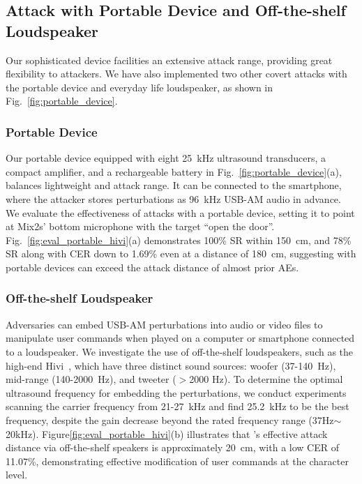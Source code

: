 \subsection{Attack with Portable Device and Off-the-shelf Loudspeaker}\label{sec:portable_attack}
Our sophisticated device facilities an extensive attack range, providing great flexibility to attackers. We have also implemented two other covert attacks with the portable device and everyday life loudspeaker, as shown in Fig.~\ref{fig:portable_device}.
\subsubsection{Portable Device}
Our portable device equipped with eight 25~kHz ultrasound transducers, a compact amplifier, and a rechargeable battery in Fig.~\ref{fig:portable_device}(a), balances lightweight and attack range. It can be connected to the smartphone, where the attacker stores perturbations as 96~kHz USB-AM audio in advance. We evaluate the effectiveness of attacks with a portable device, setting it to point at Mix2s' bottom microphone with the target ``open the door''. Fig.~\ref{fig:eval_portable_hivi}(a) demonstrates 100\% SR within 150~cm, and 78\% SR along with CER down to 1.69\% even at a distance of 180~cm, suggesting \alias with portable devices can exceed the attack distance of almost prior AEs.

\subsubsection{Off-the-shelf Loudspeaker}
Adversaries can embed USB-AM perturbations into audio or video files to manipulate user commands when played on a computer or smartphone connected to a loudspeaker. We investigate the use of off-the-shelf loudspeakers, such as the high-end Hivi~\cite{hivi}, which have three distinct sound sources: woofer (37-140~Hz), mid-range (140-2000~Hz), and tweeter ($>$2000 Hz).
To determine the optimal ultrasound frequency for embedding the perturbations, we conduct experiments scanning the carrier frequency from 21-27~kHz and find 25.2~kHz to be the best frequency, despite the gain decrease beyond the rated frequency range (37Hz$\sim$20kHz).
Figure\ref{fig:eval_portable_hivi}(b) illustrates that \alias's effective attack distance via off-the-shelf speakers is approximately 20~cm, with a low CER of 11.07\%, demonstrating effective modification of user commands at the character level. %

